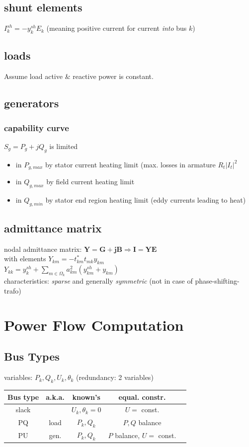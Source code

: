 \documentclass[a4paper,10pt,landscape]{scrartcl}
\begin{document}
\begin{multicols*}{3}
\subsection{shunt elements}
$I_k^{sh}=-y_k^{sh}E_k$ (meaning positive current for current \textit{into} bus $k$)

\subsection{loads}
Assume load active \& reactive power is constant.
\subsection{generators}
\subsubsection{capability curve}
$S_g=P_g + jQ_g$ is limited
\begin{itemize}
    \item in $P_{g,max}$ by stator current heating limit (max. losses in armature $R_t|I_t|^2$
    \item in $Q_{g,max}$ by field current heating limit
    \item in $Q_{g,min}$ by stator end region heating limit (eddy currents leading to heat)
\end{itemize}

\subsection{admittance matrix}
nodal admittance matrix: $\mathbf{Y=G+jB}\Rightarrow\mathbf{I=YE}$ \\
with elements
$Y_{km} = -t_{km}^*t_{mk}y_{km}$ \\
$Y_{kk} = y_k^{sh}+\underset{m\in\Omega_k}{\sum}a_{km}^2(y_{km}^{sh} + y_{km})$ \\
characteristics: \textit{sparse} and generally \textit{symmetric} (not in case of phase-shifting-trafo)

\section{Power Flow Computation}
\subsection{Bus Types}
variables: $P_k,Q_k,U_k,\theta_k$ (redundancy: 2 variables)

\begin{table}[H]
    \centering
    \begin{tabular}{c|c|c|c|c}
         Bus type&  a.k.a.& known's & equal. constr. & \\ \hline
         slack&  & $U_k,\theta_k=0$ & $U=$ const. & \\
         PQ&  load& $P_k,Q_k$ & $P,Q$ balance & \\
         PU&  gen.& $P_k,Q_k$ & $P$ balance, $U=$ const. & \\
    \end{tabular}
\end{table}


\end{multicols*}
\end{document}
